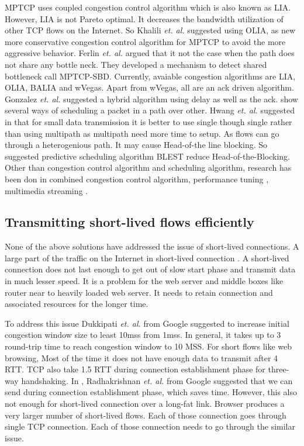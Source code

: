 MPTCP uses coupled congestion control algorithm which is also known as LIA\cite{LIARFC6356}. However, LIA is not Pareto optimal\cite{OLIARamin2012}. It decreases the bandwidth utilization of other TCP flows on the Internet. So Khalili \textit{et. al.} suggested using OLIA, as new more conservative congestion control algorithm for MPTCP to avoid the more aggressive behavior. Ferlin \textit{et. al.} argued that it not the case when the path does not share any bottle neck\cite{MPTCP-SBD}. They developed a mechanism to detect shared bottleneck call MPTCP-SBD.
Currently, avaiable congestion algorithms are LIA, OLIA, BALIA and wVegas\cite{wVegas}. Apart from wVegas, all are an ack driven algorithm. Gonzalez \textit{et. al.} suggested a hybrid algorithm\cite{Balia-wvegas} using delay as well as the ack. \cite{aschedulermptcp,blestschedular,scheadulerformptcp} show several ways of scheduling a packet in a path over other. Hwang \textit{et. al.} suggested in \cite{scheadulerformptcp} that for small data transmission it is better to use single though single rather than using multipath as multipath need more time to setup. As flows can go through a heterogenious path. It may cause Head-of-the line blocking. So \cite{blestschedular} suggested predictive scheduling algorithm BLEST reduce Head-of-the-Blocking. Other than congestion control algorithm and scheduling algorithm, research has been don in combined congestion control algorithm\cite{outofordermptcp}, performance tuning \cite{optimization}, multimedia streaming \cite{streaming}.


\subsection{Transmitting short-lived flows efficiently}

None of the above solutions have addressed the issue of short-lived connections. A large part of the traffic on the Internet in short-lived connection \cite{kheirkhah2015short}. A short-lived connection does not last enough to get out of slow start phase and transmit data in much lesser speed. It is a problem for the web server and middle boxes like router near to heavily loaded web server. It needs to retain connection and associated resources for the longer time. 

To address this issue Dukkipati \textit{et. al.} from Google suggested to increase initial congestion window size to least 10mss\cite{google-long-initcwnd} from 1mss. In general, it takes up to 3 round-trip time to reach congestion window to 10 MSS. For short flows like web browsing, Most of the time it does not have enough data to transmit after 4 RTT. TCP also take 1.5 RTT during connection establishment phase for three-way handshaking. In \cite{google-fast-open}, Radhakrishnan \textit{et. al.} from Google suggested that we can send during connection establishment phase, which saves time. However, this also not enough for short-lived connection over a long-fat link. Browser produces a very larger number of short-lived flows. Each of those connection goes through single TCP connection. Each of those connection needs to go through the similar issue. 

